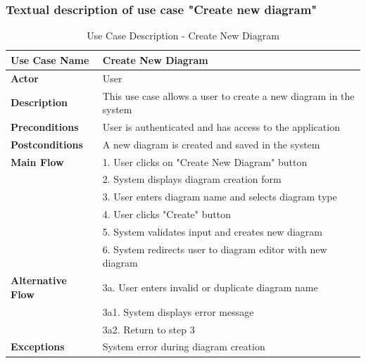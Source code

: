 \subsubsection{Textual description of use case "Create new diagram"}
\begin{table}[H]
\centering
\caption{Use Case Description - Create New Diagram}
\begin{tabular}{|l|p{10cm}|}
\hline
\textbf{Use Case Name} & Create New Diagram \\
\hline
\textbf{Actor} & User \\
\hline
\textbf{Description} & This use case allows a user to create a new diagram in the system \\
\hline
\textbf{Preconditions} & User is authenticated and has access to the application \\
\hline
\textbf{Postconditions} & A new diagram is created and saved in the system \\
\hline
\textbf{Main Flow} & 1. User clicks on "Create New Diagram" button \\
& 2. System displays diagram creation form \\
& 3. User enters diagram name and selects diagram type \\
& 4. User clicks "Create" button \\
& 5. System validates input and creates new diagram \\
& 6. System redirects user to diagram editor with new diagram \\
\hline
\textbf{Alternative Flow} & 3a. User enters invalid or duplicate diagram name \\
& 3a1. System displays error message \\
& 3a2. Return to step 3 \\
\hline
\textbf{Exceptions} & System error during diagram creation \\
\hline
\end{tabular}
\end{table}

